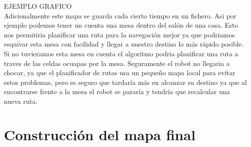 {EJEMPLO GRAFICO}\\

Adicionalmente este mapa se guarda cada cierto tiempo en un fichero. Asi por ejemplo podemos tener un cuenta una mesa dentro del salón de una casa. Esto nos permitiria planificar una ruta para la navegación mejor ya que podriamos esquivar esta mesa con facilidad y llegar a nuestro destino lo más rápido posible. Si no tuvieramos esta mesa en cuenta el algoritmo podria planificar una ruta a traves de las celdas ocuapas por la mesa. Seguramente el robot no llegaria a chocar, ya que el planificador de rutas usa un pequeño mapa local para evitar estos problemas, pero es seguro que tardaría más en alcanzar su destino ya que al encontrarse frente a la mesa el robot se pararía y tendría que recalcular una nueva ruta. 



\section{Construcción del mapa final}
\label{sec:construccionmap}

